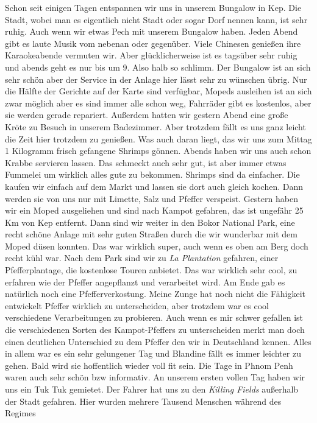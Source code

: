 \documentclass[11pt]{book}
\begin{document}
Schon seit einigen Tagen entspannen wir uns in unserem Bungalow in Kep. Die Stadt, wobei man es eigentlich nicht Stadt oder sogar 
Dorf nennen kann, ist sehr ruhig. Auch wenn wir etwas Pech mit unserem Bungalow haben. Jeden Abend gibt es laute Musik vom nebenan 
oder gegenüber. Viele Chinesen genießen ihre Karaokeabende vermuten wir. Aber glücklicherweise ist es tagsüber sehr ruhig und abends 
geht es nur bis um 9. Also halb so schlimm. Der Bungalow ist an sich sehr schön aber der Service in der Anlage hier lässt sehr zu 
wünschen übrig. Nur die Hälfte der Gerichte auf der Karte sind verfügbar, Mopeds ausleihen ist an sich zwar möglich aber es sind 
immer alle schon weg, Fahrräder gibt es kostenlos, aber sie werden gerade repariert. Außerdem hatten wir gestern Abend eine große 
Kröte zu Besuch in unserem Badezimmer. Aber trotzdem fällt es uns ganz leicht die Zeit hier trotzdem zu genießen. Was auch daran liegt, 
das wir uns zum Mittag 1 Kilogramm frisch gefangene Shrimps gönnen. Abends haben wir uns auch schon Krabbe servieren lassen. Das 
schmeckt auch sehr gut, ist aber immer etwas Fummelei um wirklich alles gute zu bekommen. Shrimps sind da einfacher. Die kaufen wir 
einfach auf dem Markt und lassen sie dort auch gleich kochen. Dann werden sie von uns nur mit Limette, Salz und Pfeffer verspeist.
Gestern haben wir ein Moped ausgeliehen und sind nach Kampot gefahren, das ist ungefähr 25 Km von Kep entfernt. Dann sind wir weiter in den 
Bokor National Park, eine recht schöne Anlage mit sehr guten Straßen durch die wir wunderbar mit dem Moped düsen konnten. Das war 
wirklich super, auch wenn es oben am Berg doch recht kühl war. Nach dem Park sind wir zu \emph{La Plantation} gefahren, einer Pfefferplantage, 
die kostenlose Touren anbietet. Das war wirklich sehr cool, zu erfahren wie der Pfeffer angepflanzt und verarbeitet wird. Am Ende 
gab es natürlich noch eine Pfefferverkostung. Meine Zunge hat noch nicht die Fähigkeit entwickelt Pfeffer wirklich zu unterscheiden, 
aber trotzdem war es cool verschiedene Verarbeitungen zu probieren. Auch wenn es mir schwer gefallen ist die verschiedenen Sorten 
des Kampot-Pfeffers zu unterscheiden merkt man doch einen deutlichen Unterschied zu dem Pfeffer den wir in Deutschland kennen. Alles 
in allem war es ein sehr gelungener Tag und Blandine fällt es immer leichter zu gehen. Bald wird sie hoffentlich wieder voll fit sein.
Die Tage in Phnom Penh waren auch sehr schön bzw informativ. An unserem ersten vollen Tag haben wir uns ein Tuk Tuk gemietet. Der 
Fahrer hat uns zu den \emph{Killing Fields} außerhalb der Stadt gefahren. Hier wurden mehrere Tausend Menschen während des Regimes 
\end{document}
